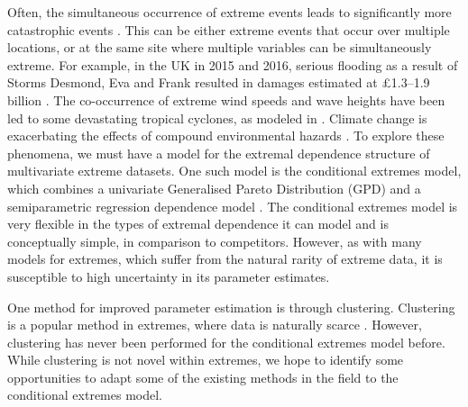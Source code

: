 \documentclass{article}
\numberwithin{equation}{section}
\begin{document}
Often, the simultaneous occurrence of extreme events leads to significantly more catastrophic events \citep{zscheischler2018future, bevacqua2021guidelines}.
This can be either extreme events that occur over multiple locations, or at the same site where multiple variables can be simultaneously extreme.
For example, in the UK in 2015 and 2016, serious flooding as a result of Storms Desmond, Eva and Frank resulted in damages estimated at £1.3–1.9 billion \citep{FloodsWinter, Rohrbeck2021}.
The co-occurrence of extreme wind speeds and wave heights have been led to some devastating tropical cyclones, as modeled in \citet{Sando2022}.
Climate change is exacerbating the effects of compound environmental hazards \citet{AghaKouchak2020-ji}.
To explore these phenomena, we must have a model for the extremal dependence structure of multivariate extreme datasets.
One such model is the conditional extremes model, which combines a univariate Generalised Pareto Distribution (GPD) and a semiparametric regression dependence model \cite{Heffernan2004}.
The conditional extremes model is very flexible in the types of extremal dependence it can model and is conceptually simple, in comparison to competitors.
However, as with many models for extremes, which suffer from the natural rarity of extreme data, it is susceptible to high uncertainty in its parameter estimates. 

One method for improved parameter estimation is through clustering.
Clustering is a popular method in extremes, where data is naturally scarce \citep{Ferreira2023-mz, Zheng2023-jf}.
However, clustering has never been performed for the conditional extremes model before. 
While clustering is not novel within extremes, we hope to identify some opportunities to adapt some of the existing methods in the field to the conditional extremes model.
\end{document}
